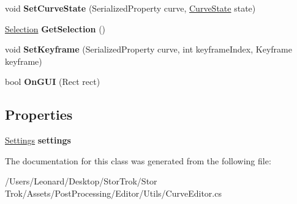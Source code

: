 \begin{DoxyCompactItemize}
\item 
\mbox{\label{class_unity_editor_1_1_post_processing_1_1_curve_editor_adda8f9c24e3ca6427dc4925149eb335f}} 
void {\bfseries Set\+Curve\+State} (Serialized\+Property curve, \hyperlink{struct_unity_editor_1_1_post_processing_1_1_curve_editor_1_1_curve_state}{Curve\+State} state)
\item 
\mbox{\label{class_unity_editor_1_1_post_processing_1_1_curve_editor_aa582a6afdd1d913fcf3f4487aad3aa23}} 
\hyperlink{struct_unity_editor_1_1_post_processing_1_1_curve_editor_1_1_selection}{Selection} {\bfseries Get\+Selection} ()
\item 
\mbox{\label{class_unity_editor_1_1_post_processing_1_1_curve_editor_ab7f943a6c54cfc8ac566368fd75f1ec3}} 
void {\bfseries Set\+Keyframe} (Serialized\+Property curve, int keyframe\+Index, Keyframe keyframe)
\item 
\mbox{\label{class_unity_editor_1_1_post_processing_1_1_curve_editor_acdfe09e9ed98fd21d533de5b7b46f0a2}} 
bool {\bfseries On\+G\+UI} (Rect rect)
\end{DoxyCompactItemize}
\subsection*{Properties}
\begin{DoxyCompactItemize}
\item 
\mbox{\label{class_unity_editor_1_1_post_processing_1_1_curve_editor_abd5edf07120ac0632d77f9b6701311c0}} 
\hyperlink{struct_unity_editor_1_1_post_processing_1_1_curve_editor_1_1_settings}{Settings} {\bfseries settings}
\end{DoxyCompactItemize}


The documentation for this class was generated from the following file\+:\begin{DoxyCompactItemize}
\item 
/\+Users/\+Leonard/\+Desktop/\+Stor\+Trok/\+Stor Trok/\+Assets/\+Post\+Processing/\+Editor/\+Utils/Curve\+Editor.\+cs\end{DoxyCompactItemize}
